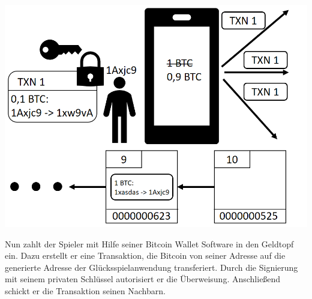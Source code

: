 \vspace{1cm}
\begin{minipage}{0.55\textwidth}
\includegraphics[width=\textwidth]{Figures/konzept_btc/konzept3}
\centering
\decoRule
{}
\label{fig:konzept3}
\end{minipage}
\begin{minipage}{0.45\textwidth}
Nun zahlt der Spieler mit Hilfe seiner Bitcoin Wallet Software in den Geldtopf ein. Dazu erstellt er eine Transaktion, die Bitcoin von seiner Adresse auf die generierte Adresse der Glücksspielanwendung transferiert. Durch die Signierung mit seinem privaten Schlüssel autorisiert er die Überweisung. Anschließend schickt er die Transaktion seinen Nachbarn.
\end{minipage}

